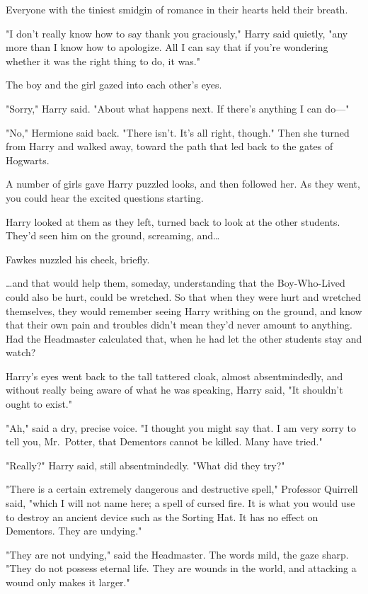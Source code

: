 Everyone with the tiniest smidgin of romance in their hearts held their breath.

"I don't really know how to say thank you graciously," Harry said quietly, "any 
more than I know how to apologize. All I can say that if you're wondering 
whether it was the right thing to do, it was."

The boy and the girl gazed into each other's eyes.

"Sorry," Harry said. "About what happens next. If there's anything I can do---"

"No," Hermione said back. "There isn't. It's all right, though." Then she 
turned from Harry and walked away, toward the path that led back to the gates 
of Hogwarts.

A number of girls gave Harry puzzled looks, and then followed her. As they 
went, you could hear the excited questions starting.

Harry looked at them as they left, turned back to look at the other students. 
They'd seen him on the ground, screaming, and{\ldots}

Fawkes nuzzled his cheek, briefly.

{\ldots}and that would help them, someday, understanding that the Boy-Who-Lived 
could also be hurt, could be wretched. So that when they were hurt and wretched 
themselves, they would remember seeing Harry writhing on the ground, and know 
that their own pain and troubles didn't mean they'd never amount to anything. 
Had the Headmaster calculated that, when he had let the other students stay and 
watch?

Harry's eyes went back to the tall tattered cloak, almost absentmindedly, and 
without really being aware of what he was speaking, Harry said, "It shouldn't 
ought to exist."

"Ah," said a dry, precise voice. "I thought you might say that. I am very sorry 
to tell you, Mr.~Potter, that Dementors cannot be killed. Many have tried."

"Really?" Harry said, still absentmindedly. "What did they try?"

"There is a certain extremely dangerous and destructive spell," Professor 
Quirrell said, "which I will not name here; a spell of cursed fire. It is what 
you would use to destroy an ancient device such as the Sorting Hat. It has no 
effect on Dementors. They are undying."

"They are not undying," said the Headmaster. The words mild, the gaze sharp. 
"They do not possess eternal life. They are wounds in the world, and attacking 
a wound only makes it larger."

